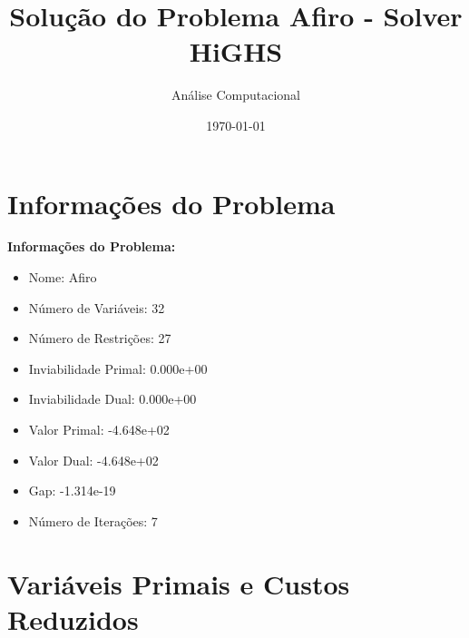 \documentclass[12pt]{article}
\title{Solução do Problema Afiro - Solver HiGHS}
\author{Análise Computacional}
\date{\today}
\begin{document}
\maketitle

\section{Informações do Problema}

\textbf{Informações do Problema:}
\begin{itemize}
\item Nome: Afiro
\item Número de Variáveis: 32
\item Número de Restrições: 27
\item Inviabilidade Primal: 0.000e+00
\item Inviabilidade Dual: 0.000e+00
\item Valor Primal: -4.648e+02
\item Valor Dual: -4.648e+02
\item Gap: -1.314e-19
\item Número de Iterações: 7
\end{itemize}


\section{Variáveis Primais e Custos Reduzidos}
\end{document}
